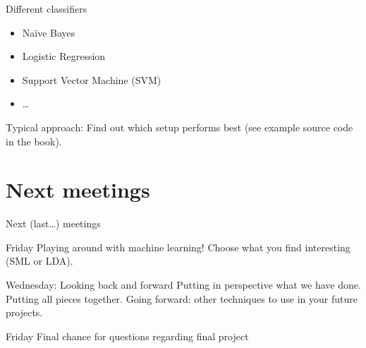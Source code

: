 \documentclass{beamer}
\begin{document}
\begin{frame}{Different classifiers}
	\begin{itemize}
		\item Naïve Bayes
		\item Logistic Regression
		\item Support Vector Machine (SVM)
		\item \ldots
	\end{itemize}
Typical approach: Find out which setup performs best (see example source code in the book).
\end{frame}





\section{Next meetings}
\begin{frame}{Next (last\ldots) meetings}
\begin{block}{Friday}
Playing around with machine learning! Choose what you find interesting (SML or LDA).
\end{block}

\begin{block}{Wednesday: Looking back and forward }
Putting in perspective what we have done. Putting all pieces together. Going forward: other techniques to use in your future projects.
\end{block}


\begin{block}{Friday}
	Final chance for questions regarding final project
\end{block}


\end{frame}
\end{document}
